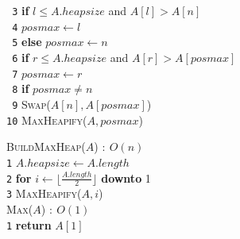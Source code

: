 \documentclass[10pt,landscape]{article}
\begin{document}
\begin{multicols*}{4}
                \texttt{ 3}\hspace*{0.5em} \textbf{if} $l \leq A.heapsize$ and $A[l] > A[n]$      \\
                \texttt{ 4}\hspace*{1.5em} $posmax \leftarrow l$                                  \\
                \texttt{ 5}\hspace*{0.5em} \textbf{else} $posmax \leftarrow n$                    \\
                \texttt{ 6}\hspace*{0.5em} \textbf{if} $r \leq A.heapsize$ and $A[r] > A[posmax]$ \\
                \texttt{ 7}\hspace*{1.5em} $posmax \leftarrow r$                                  \\
                \texttt{ 8}\hspace*{0.5em} \textbf{if} $posmax \neq n$                            \\
                \texttt{ 9}\hspace*{1.5em} \textsc{Swap}($A[n],A[posmax]$)                        \\
                \texttt{10}\hspace*{1.5em} \textsc{MaxHeapify}($A,posmax$)                       \\ [5pt]
                \begin{multicols}{2}
                        \textsc{BuildMaxHeap($A$)} $:\ O(n)$                                     \\ [3pt]
                        \texttt{1}\hspace*{0.5em} $A.heapsize \leftarrow A.length$                      \\
                        \texttt{2}\hspace*{0.5em} \textbf{for }$i \leftarrow \lfloor\frac{A.length}{2}\rfloor$ \textbf{downto} 1                     \\
                        \texttt{3}\hspace*{1.5em} \textsc{MaxHeapify}($A,i$)      \\
                        \columnbreak
                        \textsc{Max($A$)} $:\ O(1)$ \\ [3pt]
                        \texttt{1}\hspace*{0.5em} \textbf{return} $A[1]$                     \\
                \end{multicols}

\end{multicols*}
\end{document}
